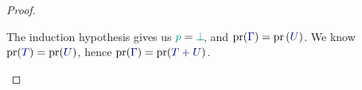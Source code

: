 \begin{proof}
\begin{case*}
    \begin{mathpar}
    \end{mathpar}
  \end{case*}
  \begin{case*}
    The induction hypothesis gives us $\cs{p}=\cs{\pbot}$, and $\pr(\ty{\Gamma})=\pr{(\ty{U})}$. We know $\pr(\ty{T})=\pr({\ty{U}})$, hence $\pr(\ty{\Gamma})=\pr(\ty{\tysum{T}{U}})$.
    \begin{mathpar}
    \end{mathpar}
  \end{case*}
\end{proof}

